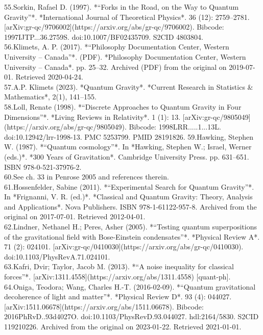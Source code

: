 55.Sorkin, Rafael D. (1997). *“Forks in the Road, on the Way to Quantum Gravity”*. *International Journal of Theoretical Physics*. 36 (12): 2759–2781. [arXiv:gr-qc/9706002](https://arxiv.org/abs/gr-qc/9706002). Bibcode: 1997IJTP...36.2759S. doi:10.1007/BF02435709. S2CID 4803804.\\
56.Klimets, A. P. (2017). *“Philosophy Documentation Center, Western University – Canada”*. (PDF). *Philosophy Documentation Center, Western University – Canada*. pp. 25–32. Archived (PDF) from the original on 2019-07-01. Retrieved 2020-04-24.\\
57.A.P. Klimets (2023). *Quantum Gravity*. *Current Research in Statistics & Mathematics*, 2(1), 141–155.\\
58.Loll, Renate (1998). *“Discrete Approaches to Quantum Gravity in Four Dimensions”*. *Living Reviews in Relativity*. 1 (1): 13. [arXiv:gr-qc/9805049](https://arxiv.org/abs/gr-qc/9805049). Bibcode: 1998LRR.....1...13L. doi:10.12942/lrr-1998-13. PMC 5253799. PMID 28191826.
59.Hawking, Stephen W. (1987). *“Quantum cosmology”*. In *Hawking, Stephen W.; Israel, Werner (eds.)*. *300 Years of Gravitation*. Cambridge University Press. pp. 631–651. ISBN 978-0-521-37976-2.\\
60.See ch. 33 in Penrose 2005 and references therein.\\
61.Hossenfelder, Sabine (2011). *“Experimental Search for Quantum Gravity”*. In *Frignanni, V. R. (ed.)*. *Classical and Quantum Gravity: Theory, Analysis and Applications*. Nova Publishers. ISBN 978-1-61122-957-8. Archived from the original on 2017-07-01. Retrieved 2012-04-01.\\
62.Lindner, Nethanel H.; Peres, Asher (2005). *“Testing quantum superpositions of the gravitational field with Bose-Einstein condensates”*. *Physical Review A*. 71 (2): 024101. [arXiv:gr-qc/0410030](https://arxiv.org/abs/gr-qc/0410030). doi:10.1103/PhysRevA.71.024101.\\
63.Kafri, Dvir; Taylor, Jacob M. (2013). *“A noise inequality for classical forces”*. [arXiv:1311.4558](https://arxiv.org/abs/1311.4558) [quant-ph].\\
64.Oniga, Teodora; Wang, Charles H.-T. (2016-02-09). *“Quantum gravitational decoherence of light and matter”*. *Physical Review D*. 93 (4): 044027. [arXiv:1511.06678](https://arxiv.org/abs/1511.06678). Bibcode: 2016PhRvD..93d4027O. doi:10.1103/PhysRevD.93.044027. hdl:2164/5830. S2CID 119210226. Archived from the original on 2023-01-22. Retrieved 2021-01-01.\\